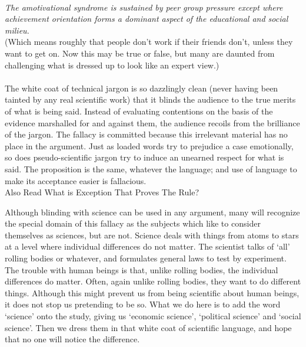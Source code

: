 \documentclass[a4paper,12pt,single,pdftex]{scrartcl}
\begin{document}
    
       
    \\

    
      {\em The amotivational syndrome is sustained by peer group pressure except where achievement orientation forms a dominant aspect of the educational and social milieu.}
    \\

    
      (Which means roughly that people don’t work if their friends don’t, unless they want to get on. Now this may be true or false, but many are daunted from challenging what is dressed up to look like an expert view.)
    \\

    
       
    \\

    
      The white coat of technical jargon is so dazzlingly clean (never having been tainted by any real scientific work) that it blinds the audience to the true merits of what is being said. Instead of evaluating contentions on the basis of the evidence marshalled for and against them, the audience recoils from the brilliance of the jargon. The fallacy is committed because this irrelevant material has no place in the argument. Just as loaded words try to prejudice a case emotionally, so does pseudo-scientific jargon try to induce an unearned respect for what is said. The proposition is the same, whatever the language; and use of language to make its acceptance easier is fallacious.
    \\

    
      

      
        Also Read  What is Exception That Proves The Rule?
      
    
    
      Although blinding with science can be used in any argument, many will recognize the special domain of this fallacy as the subjects which like to consider themselves as sciences, but are not. Science deals with things from atoms to stars at a level where individual differences do not matter. The scientist talks of ‘all’ rolling bodies or whatever, and formulates general laws to test by experiment. The trouble with human beings is that, unlike rolling bodies, the individual differences do matter. Often, again unlike rolling bodies, they want to do different things. Although this might prevent us from being scientific about human beings, it does not stop us pretending to be so. What we do here is to add the word ‘science’ onto the study, giving us ‘economic science’, ‘political science’ and ‘social science’. Then we dress them in that white coat of scientific language, and hope that no one will notice the difference.
    \\
\end{document}
